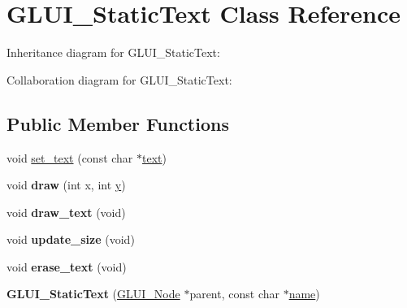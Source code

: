 \hypertarget{class_g_l_u_i___static_text}{\section{G\+L\+U\+I\+\_\+\+Static\+Text Class Reference}
\label{class_g_l_u_i___static_text}
}


Inheritance diagram for G\+L\+U\+I\+\_\+\+Static\+Text\+:


Collaboration diagram for G\+L\+U\+I\+\_\+\+Static\+Text\+:
\subsection*{Public Member Functions}
\begin{DoxyCompactItemize}
\item 
void \hyperlink{class_g_l_u_i___static_text_a2105e6f3f6061ccfaca8a24b2f984291}{set\+\_\+text} (const char $\ast$\hyperlink{class_g_l_u_i___control_af0d60e9736f4dbc34e9a536e75876d72}{text})
\item 
\hypertarget{class_g_l_u_i___static_text_a2d92dfeb76e42682dbb69f26fc903194}{void {\bfseries draw} (int x, int \hyperlink{_ice_utils_8h_aa7ffaed69623192258fb8679569ff9ba}{y})}\label{class_g_l_u_i___static_text_a2d92dfeb76e42682dbb69f26fc903194}

\item 
\hypertarget{class_g_l_u_i___static_text_ab29d8982750fe76f607b18bcc00febdf}{void {\bfseries draw\+\_\+text} (void)}\label{class_g_l_u_i___static_text_ab29d8982750fe76f607b18bcc00febdf}

\item 
\hypertarget{class_g_l_u_i___static_text_ab244674e811501594eca5ea312a30bdd}{void {\bfseries update\+\_\+size} (void)}\label{class_g_l_u_i___static_text_ab244674e811501594eca5ea312a30bdd}

\item 
\hypertarget{class_g_l_u_i___static_text_ae7d5da0264d0b04a46bfb8c27e441b58}{void {\bfseries erase\+\_\+text} (void)}\label{class_g_l_u_i___static_text_ae7d5da0264d0b04a46bfb8c27e441b58}

\item 
\hypertarget{class_g_l_u_i___static_text_a47e7c2daa86db06eed1dea62b0ac091c}{{\bfseries G\+L\+U\+I\+\_\+\+Static\+Text} (\hyperlink{class_g_l_u_i___node}{G\+L\+U\+I\+\_\+\+Node} $\ast$parent, const char $\ast$\hyperlink{class_g_l_u_i___control_aa95b97d50df45335fc33f0af03958eb3}{name})}\label{class_g_l_u_i___static_text_a47e7c2daa86db06eed1dea62b0ac091c}

\end{DoxyCompactItemize}
